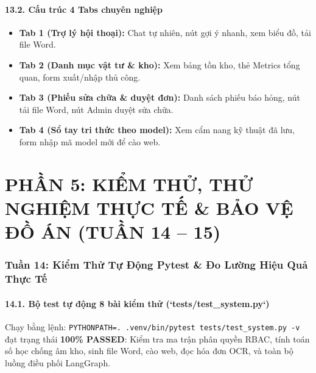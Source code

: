\documentclass[11pt,a4paper]{article}
\begin{document}
\subsection{13.2. Cấu trúc 4 Tabs chuyên nghiệp}
\begin{itemize}
    \item \textbf{Tab 1 (Trợ lý hội thoại):} Chat tự nhiên, nút gợi ý nhanh, xem biểu đồ, tải file Word.
    \item \textbf{Tab 2 (Danh mục vật tư \& kho):} Xem bảng tồn kho, thẻ Metrics tổng quan, form xuất/nhập thủ công.
    \item \textbf{Tab 3 (Phiếu sửa chữa \& duyệt đơn):} Danh sách phiếu báo hỏng, nút tải file Word, nút Admin duyệt sửa chữa.
    \item \textbf{Tab 4 (Sổ tay tri thức theo model):} Xem cẩm nang kỹ thuật đã lưu, form nhập mã model mới để cào web.
\end{itemize}

\newpage

\part*{\Large \color{blue!85!black} PHẦN 5: KIỂM THỬ, THỬ NGHIỆM THỰC TẾ \& BẢO VỆ ĐỒ ÁN (TUẦN 14 -- 15)}

\section{Tuần 14: Kiểm Thử Tự Động Pytest \& Đo Lường Hiệu Quả Thực Tế}

\subsection{14.1. Bộ test tự động 8 bài kiểm thử (`tests/test\_system.py`)}
Chạy bằng lệnh: \texttt{PYTHONPATH=. .venv/bin/pytest tests/test\_system.py -v} đạt trạng thái \textbf{100\% PASSED}:
Kiểm tra ma trận phân quyền RBAC, tính toán số học chống âm kho, sinh file Word, cào web, đọc hóa đơn OCR, và toàn bộ luồng điều phối LangGraph.
\end{document}
